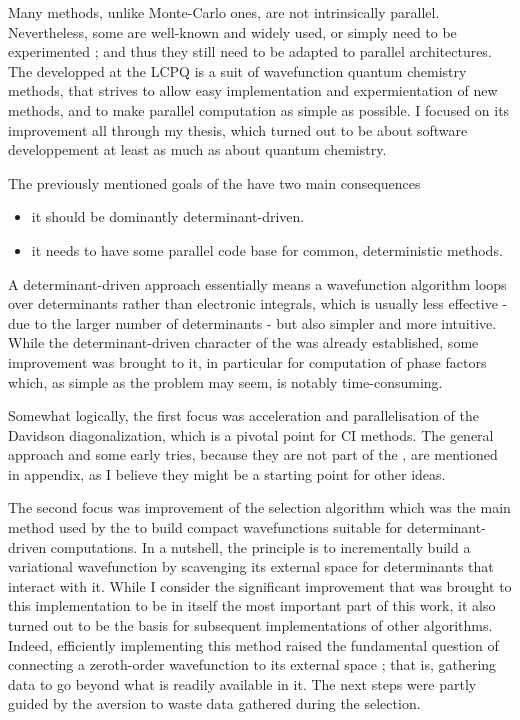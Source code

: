 \documentclass[12pt,a4paper]{report}
\begin{document}
Many methods, unlike Monte-Carlo ones, are not intrinsically parallel. Nevertheless, some are well-known and widely used, or simply need to be experimented ; and thus they still need to be adapted to parallel architectures. The \QP developped at the LCPQ is a suit of wavefunction quantum chemistry methods, that strives to allow easy implementation and expermientation of new methods, and to make parallel computation as simple as possible. I focused on its improvement all through my thesis, which turned out to be about software developpement at least as much as about quantum chemistry.

The previously mentioned goals of the \QP have two main consequences
\begin{itemize}
\item
it should be dominantly determinant-driven.
\item
it needs to have some parallel code base for common, deterministic methods.
\end{itemize}


A determinant-driven approach essentially means a wavefunction algorithm loops over determinants rather than electronic integrals, which is usually less effective - due to the larger number of determinants - but also simpler and more intuitive. While the determinant-driven character of the \QP was already established, some improvement was brought to it, in particular for computation of phase factors which, as simple as the problem may seem, is notably time-consuming.

Somewhat logically, the first focus was acceleration and parallelisation of the Davidson diagonalization, which is a pivotal point for CI methods. \alert{The general approach and some early tries, because they are not part of the \QP, are mentioned in appendix, as I believe they might be a starting point for other ideas.}

The second focus was improvement of the selection algorithm which was the main method used by the \QP to build compact wavefunctions suitable for determinant-driven computations. In a nutshell, the principle is to incrementally build a variational wavefunction by scavenging its external space for determinants that interact with it. While I consider the significant improvement that was brought to this implementation to be in itself the most important part of this work, it also turned out to be the basis for subsequent implementations of other algorithms. Indeed, efficiently implementing this method raised the fundamental question of connecting a \alert{zeroth-order} wavefunction to its external space ; that is, gathering data to go beyond what is readily available in it. The next steps were partly guided by the aversion to waste data gathered during the selection.
\end{document}
